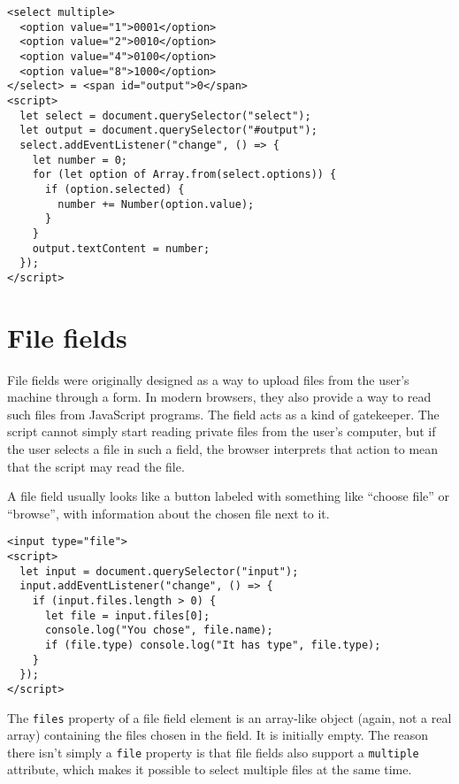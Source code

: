 \begin{lstlisting}
<select multiple>
  <option value="1">0001</option>
  <option value="2">0010</option>
  <option value="4">0100</option>
  <option value="8">1000</option>
</select> = <span id="output">0</span>
<script>
  let select = document.querySelector("select");
  let output = document.querySelector("#output");
  select.addEventListener("change", () => {
    let number = 0;
    for (let option of Array.from(select.options)) {
      if (option.selected) {
        number += Number(option.value);
      }
    }
    output.textContent = number;
  });
</script>
\end{lstlisting}
\noindent

\section{File fields}

File fields were originally designed as a way to upload files from the user's machine through a form. In modern browsers, they also provide a way to read such files from JavaScript programs. The field acts as a kind of gatekeeper. The script cannot simply start reading private files from the user's computer, but if the user selects a file in such a field, the browser interprets that action to mean that the script may read the file.

A file field usually looks like a button labeled with something like ``choose file'' or ``browse'', with information about the chosen file next to it.

\begin{lstlisting}
<input type="file">
<script>
  let input = document.querySelector("input");
  input.addEventListener("change", () => {
    if (input.files.length > 0) {
      let file = input.files[0];
      console.log("You chose", file.name);
      if (file.type) console.log("It has type", file.type);
    }
  });
</script>
\end{lstlisting}
\noindent{}

The \lstinline`files` property of a file field element is an array-like object (again, not a real array) containing the files chosen in the field. It is initially empty. The reason there isn't simply a \lstinline`file` property is that file fields also support a \lstinline`multiple` attribute, which makes it possible to select multiple files at the same time.

